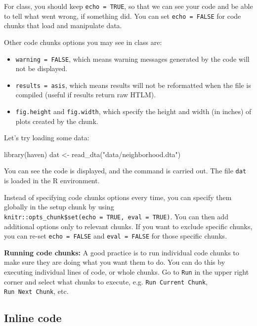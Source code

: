 \documentclass[
  letterpaper,
  DIV=11,
  numbers=noendperiod]{scrreprt}
\newenvironment{Shaded}{\begin{snugshade}}{\end{snugshade}}
\newcommand{\FunctionTok}[1]{\textcolor[rgb]{0.02,0.16,0.49}{#1}}
\newcommand{\NormalTok}[1]{\textcolor[rgb]{0.00,0.44,0.13}{#1}}
\newcommand{\OtherTok}[1]{\textcolor[rgb]{0.00,0.44,0.13}{#1}}
\newcommand{\StringTok}[1]{\textcolor[rgb]{0.25,0.44,0.63}{#1}}
\providecommand{\tightlist}{%
  \setlength{\itemsep}{0pt}\setlength{\parskip}{0pt}}\usepackage{longtable,booktabs,array}
\begin{document}
For class, you should keep \texttt{echo\ =\ TRUE}, so that we can see
your code and be able to tell what went wrong, if something did. You can
set \texttt{echo\ =\ FALSE} for code chunks that load and manipulate
data.

Other code chunks options you may see in class are:

\begin{itemize}
\tightlist
\item
  \texttt{warning\ =\ FALSE}, which means warning messages generated by
  the code will not be displayed.
\item
  \texttt{results\ =\ \textquotesingle{}asis\textquotesingle{}}, which
  means results will not be reformatted when the file is compiled
  (useful if results return raw HTLM).
\item
  \texttt{fig.height} and \texttt{fig.width}, which specify the height
  and width (in inches) of plots created by the chunk.
\end{itemize}

Let's try loading some data:

\begin{Shaded}
\begin{Highlighting}[]
\FunctionTok{library}\NormalTok{(haven)}
\NormalTok{dat }\OtherTok{\textless{}{-}} \FunctionTok{read\_dta}\NormalTok{(}\StringTok{"data/neighborhood.dta"}\NormalTok{)}
\end{Highlighting}
\end{Shaded}

You can see the code is displayed, and the command is carried out. The
file \texttt{dat} is loaded in the R environment.

Instead of specifying code chunks options every time, you can specify
them globally in the setup chunk by using
\texttt{knitr::opts\_chunk\$set(echo\ =\ TRUE,\ eval\ =\ TRUE)}. You can
then add additional options only to relevant chunks. If you want to
exclude specific chunks, you can re-set \texttt{echo\ =\ FALSE} and
\texttt{eval\ =\ FALSE} for those specific chunks.

\textbf{Running code chunks:} A good practice is to run individual code
chunks to make sure they are doing what you want them to do. You can do
this by executing individual lines of code, or whole chunks. Go to
\texttt{Run} in the upper right corner and select what chunks to
execute, e.g. \texttt{Run\ Current\ Chunk}, \texttt{Run\ Next\ Chunk},
etc.

\hypertarget{inline-code}{%
\subsection{Inline code}\label{inline-code}}
\end{document}
